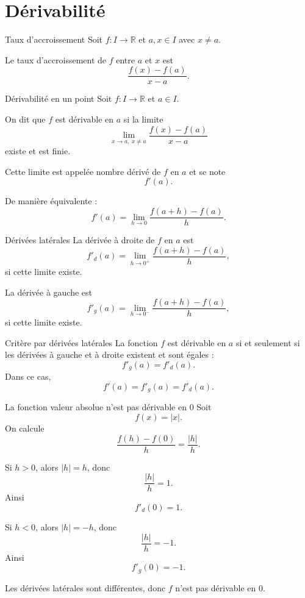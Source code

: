\documentclass[11pt,a4paper]{article}
\newcommand{\R}{\mathbb{R}}
\begin{document}
\section{Dérivabilité}

\begin{definitionbox}{Taux d'accroissement}
Soit $f:I\to\R$ et $a,x\in I$ avec $x\neq a$.

Le taux d'accroissement de $f$ entre $a$ et $x$ est
\[
\frac{f(x)-f(a)}{x-a}.
\]
\end{definitionbox}

\begin{definitionbox}{Dérivabilité en un point}
Soit $f:I\to\R$ et $a\in I$.

On dit que $f$ est dérivable en $a$ si la limite
\[
\lim_{x\to a,\ x\neq a}\frac{f(x)-f(a)}{x-a}
\]
existe et est finie.

Cette limite est appelée nombre dérivé de $f$ en $a$ et se note
\[
f'(a).
\]

De manière équivalente :
\[
f'(a)=\lim_{h\to0}\frac{f(a+h)-f(a)}{h}.
\]
\end{definitionbox}

\begin{definitionbox}{Dérivées latérales}
La dérivée à droite de $f$ en $a$ est
\[
f'_d(a)=\lim_{h\to0^+}\frac{f(a+h)-f(a)}{h},
\]
si cette limite existe.

La dérivée à gauche est
\[
f'_g(a)=\lim_{h\to0^-}\frac{f(a+h)-f(a)}{h},
\]
si cette limite existe.
\end{definitionbox}

\begin{theorembox}{Critère par dérivées latérales}
La fonction $f$ est dérivable en $a$ si et seulement si les dérivées à gauche et à droite existent et sont égales :
\[
f'_g(a)=f'_d(a).
\]
Dans ce cas,
\[
f'(a)=f'_g(a)=f'_d(a).
\]
\end{theorembox}

\begin{proofbox}{La fonction valeur absolue n'est pas dérivable en $0$}
Soit
\[
f(x)=|x|.
\]
On calcule
\[
\frac{f(h)-f(0)}{h}=\frac{|h|}{h}.
\]

Si $h>0$, alors $|h|=h$, donc
\[
\frac{|h|}{h}=1.
\]
Ainsi
\[
f'_d(0)=1.
\]

Si $h<0$, alors $|h|=-h$, donc
\[
\frac{|h|}{h}=-1.
\]
Ainsi
\[
f'_g(0)=-1.
\]

Les dérivées latérales sont différentes, donc $f$ n'est pas dérivable en $0$.
\end{proofbox}
\end{document}
